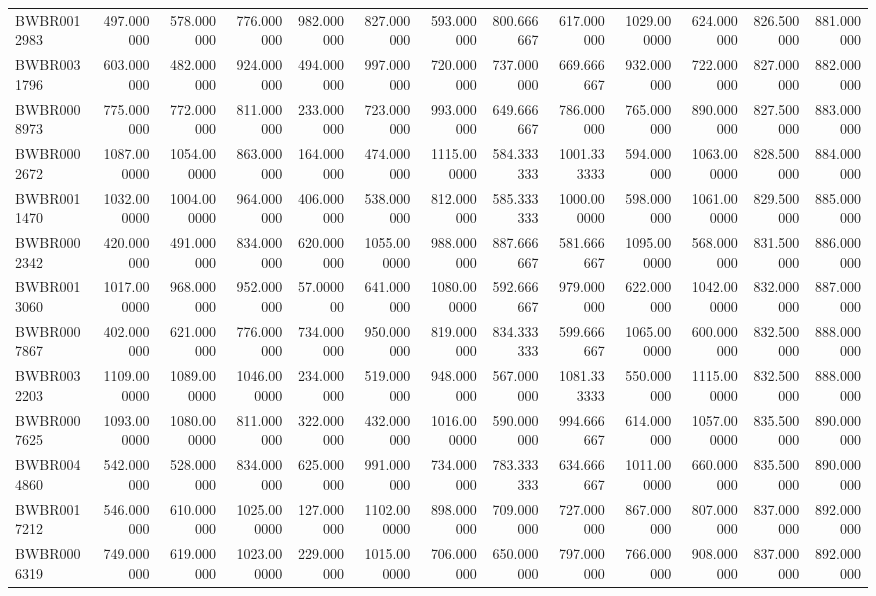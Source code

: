 \begin{longtable}{lrrrrrrrrrrrr}
BWBR0012983 & 497.000000 & 578.000000 & 776.000000 & 982.000000 & 827.000000 & 593.000000 & 800.666667 & 617.000000 & 1029.000000 & 624.000000 & 826.500000 & 881.000000 \\
BWBR0031796 & 603.000000 & 482.000000 & 924.000000 & 494.000000 & 997.000000 & 720.000000 & 737.000000 & 669.666667 & 932.000000 & 722.000000 & 827.000000 & 882.000000 \\
BWBR0008973 & 775.000000 & 772.000000 & 811.000000 & 233.000000 & 723.000000 & 993.000000 & 649.666667 & 786.000000 & 765.000000 & 890.000000 & 827.500000 & 883.000000 \\
BWBR0002672 & 1087.000000 & 1054.000000 & 863.000000 & 164.000000 & 474.000000 & 1115.000000 & 584.333333 & 1001.333333 & 594.000000 & 1063.000000 & 828.500000 & 884.000000 \\
BWBR0011470 & 1032.000000 & 1004.000000 & 964.000000 & 406.000000 & 538.000000 & 812.000000 & 585.333333 & 1000.000000 & 598.000000 & 1061.000000 & 829.500000 & 885.000000 \\
BWBR0002342 & 420.000000 & 491.000000 & 834.000000 & 620.000000 & 1055.000000 & 988.000000 & 887.666667 & 581.666667 & 1095.000000 & 568.000000 & 831.500000 & 886.000000 \\
BWBR0013060 & 1017.000000 & 968.000000 & 952.000000 & 57.000000 & 641.000000 & 1080.000000 & 592.666667 & 979.000000 & 622.000000 & 1042.000000 & 832.000000 & 887.000000 \\
BWBR0007867 & 402.000000 & 621.000000 & 776.000000 & 734.000000 & 950.000000 & 819.000000 & 834.333333 & 599.666667 & 1065.000000 & 600.000000 & 832.500000 & 888.000000 \\
BWBR0032203 & 1109.000000 & 1089.000000 & 1046.000000 & 234.000000 & 519.000000 & 948.000000 & 567.000000 & 1081.333333 & 550.000000 & 1115.000000 & 832.500000 & 888.000000 \\
BWBR0007625 & 1093.000000 & 1080.000000 & 811.000000 & 322.000000 & 432.000000 & 1016.000000 & 590.000000 & 994.666667 & 614.000000 & 1057.000000 & 835.500000 & 890.000000 \\
BWBR0044860 & 542.000000 & 528.000000 & 834.000000 & 625.000000 & 991.000000 & 734.000000 & 783.333333 & 634.666667 & 1011.000000 & 660.000000 & 835.500000 & 890.000000 \\
BWBR0017212 & 546.000000 & 610.000000 & 1025.000000 & 127.000000 & 1102.000000 & 898.000000 & 709.000000 & 727.000000 & 867.000000 & 807.000000 & 837.000000 & 892.000000 \\
BWBR0006319 & 749.000000 & 619.000000 & 1023.000000 & 229.000000 & 1015.000000 & 706.000000 & 650.000000 & 797.000000 & 766.000000 & 908.000000 & 837.000000 & 892.000000 \\

\end{longtable}
